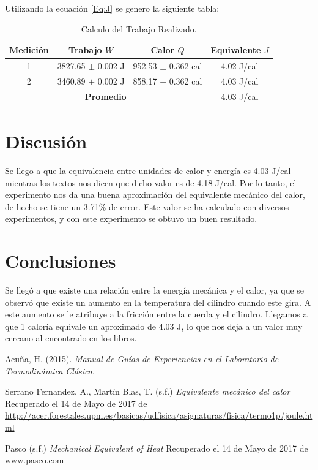 \documentclass[12pt]{article}
\begin{document}
Utilizando la ecuación \eqref{Eq:J} se genero la siguiente tabla:
	\begin{table}[H]
		\centering
		\begin{tabular}{|c|c|c|c|}
			\hline
			\textbf{Medición} & \textbf{Trabajo $W$ } & \textbf{Calor $Q$ } & \textbf{Equivalente $J$} \\ \hline
			1 & 3827.65 $\pm$ 0.002 J & 952.53 $\pm$ 0.362 cal & 4.02 J/cal \\ \hline
			2 & 3460.89 $\pm$ 0.002 J & 858.17 $\pm$ 0.362 cal & 4.03 J/cal \\ \hline
			\multicolumn{3}{|c|}{\textbf{Promedio}}            & 4.03 J/cal \\ \hline
		\end{tabular}
		\caption{Calculo del Trabajo Realizado.}
		\label{tab:J}
	\end{table}



\section{Discusión} 
Se llego a que la equivalencia entre unidades de calor y energía es 4.03 J/cal mientras los textos nos dicen que dicho valor es de 4.18 J/cal. Por lo tanto, el experimento nos da una buena aproximación del equivalente mecánico del calor, de hecho se tiene un 3.71\% de error. Este valor se ha calculado con diversos experimentos, y con este experimento se obtuvo un buen resultado.

\section{Conclusiones}
Se llegó a que existe una relación entre la energía mecánica y el calor, ya que se observó que existe un aumento en la temperatura del cilindro cuando este gira. A este aumento se le atribuye a la fricción entre la cuerda y el cilindro. Llegamos a que 1 caloría equivale un aproximado de 4.03 J, lo que nos deja a un valor muy cercano al encontrado en los libros. 


\begin{thebibliography}{3}
		Acuña, H. (2015). \textit{Manual de Guías de Experiencias en el Laboratorio de Termodinámica Clásica}.

		Serrano Fernandez, A., Martín Blas, T. (s.f.) \emph{Equivalente mecánico del calor} Recuperado el 14 de Mayo de 2017 de \url{http://acer.forestales.upm.es/basicas/udfisica/asignaturas/fisica/termo1p/joule.html}
	
		Pasco (s.f.) \textit{Mechanical Equivalent of Heat} Recuperado el 14 de Mayo de 2017 de \url{www.pasco.com}
\end{thebibliography}
\end{document}
